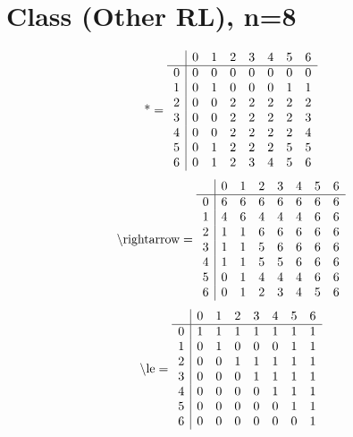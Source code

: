 \documentclass[11pt]{article}
\begin{document}
\section{Class (Other RL), n=8}
\[\text{*} = 
\begin{array}{r | r r r r r r r}
 & 0 & 1 & 2 & 3 & 4 & 5 & 6 \\ \hline
0 & 0 & 0 & 0 & 0 & 0 & 0 & 0 \\
1 & 0 & 1 & 0 & 0 & 0 & 1 & 1 \\
2 & 0 & 0 & 2 & 2 & 2 & 2 & 2 \\
3 & 0 & 0 & 2 & 2 & 2 & 2 & 3 \\
4 & 0 & 0 & 2 & 2 & 2 & 2 & 4 \\
5 & 0 & 1 & 2 & 2 & 2 & 5 & 5 \\
6 & 0 & 1 & 2 & 3 & 4 & 5 & 6 \\
\end{array}
\]
\[\text{\textbackslash rightarrow} = 
\begin{array}{r | r r r r r r r}
 & 0 & 1 & 2 & 3 & 4 & 5 & 6 \\ \hline
0 & 6 & 6 & 6 & 6 & 6 & 6 & 6 \\
1 & 4 & 6 & 4 & 4 & 4 & 6 & 6 \\
2 & 1 & 1 & 6 & 6 & 6 & 6 & 6 \\
3 & 1 & 1 & 5 & 6 & 6 & 6 & 6 \\
4 & 1 & 1 & 5 & 5 & 6 & 6 & 6 \\
5 & 0 & 1 & 4 & 4 & 4 & 6 & 6 \\
6 & 0 & 1 & 2 & 3 & 4 & 5 & 6 \\
\end{array}
\]
\[\text{\textbackslash le} = 
\begin{array}{r | r r r r r r r}
 & 0 & 1 & 2 & 3 & 4 & 5 & 6 \\ \hline
0 & 1 & 1 & 1 & 1 & 1 & 1 & 1 \\
1 & 0 & 1 & 0 & 0 & 0 & 1 & 1 \\
2 & 0 & 0 & 1 & 1 & 1 & 1 & 1 \\
3 & 0 & 0 & 0 & 1 & 1 & 1 & 1 \\
4 & 0 & 0 & 0 & 0 & 1 & 1 & 1 \\
5 & 0 & 0 & 0 & 0 & 0 & 1 & 1 \\
6 & 0 & 0 & 0 & 0 & 0 & 0 & 1 \\
\end{array}
\]
\end{document}
